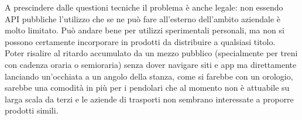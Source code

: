 \documentclass[12pt,a4paper]{report}
\begin{document}
A prescindere dalle questioni tecniche il problema è anche legale: non essendo API pubbliche l'utilizzo che se ne può fare all'esterno
dell'ambito aziendale è molto limitato. Può andare bene per utilizzi sperimentali personali, ma non si possono certamente incorporare
in prodotti da distribuire a qualsiasi titolo.\\
Poter risalire al ritardo accumulato da un mezzo pubblico (specialmente per treni con cadenza oraria o semioraria) senza dover navigare
siti e app ma direttamente lanciando un'occhiata a un angolo della stanza, come si farebbe con un orologio, sarebbe una comodità in più
per i pendolari che al momento non è attuabile su larga scala da terzi e le aziende di trasporti non sembrano interessate a proporre
prodotti simili.





\end{document}
